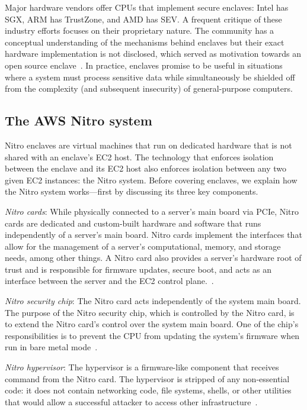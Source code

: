 Major hardware vendors offer CPUs that implement secure enclaves: Intel has SGX,
ARM has TrustZone, and AMD has SEV.  A frequent critique of these industry
efforts focuses on their proprietary nature. The community has a conceptual
understanding of the mechanisms behind enclaves but their exact hardware
implementation is not disclosed, which served as motivation towards an open
source enclave~\cite{Lee20a}.  In practice, enclaves promise to be useful in
situations where a system must process sensitive data while simultaneously be
shielded off from the complexity (and subsequent insecurity) of general-purpose
computers.

\subsection{The AWS Nitro system}%
\label{sec:nitro}

Nitro enclaves are virtual machines that run on dedicated hardware that is not
shared with an enclave's EC2 host.  The technology that enforces isolation
between the enclave and its EC2 host also enforces isolation between any two
given EC2 instances: the Nitro system.  Before covering enclaves, we explain how
the Nitro system works---first by discussing its three key components.

\emph{Nitro cards}: While physically connected to a server's main board via
PCIe, Nitro cards are dedicated and custom-built hardware and software that runs
independently of a server's main board.  Nitro cards implement the interfaces
that allow for the management of a server's computational, memory, and storage
needs, among other things.  A Nitro card also provides a server's hardware root
of trust and is responsible for firmware updates, secure boot, and acts as an
interface between the server and the EC2 control plane.~\cite[pp.
7--10]{Bean2022a}.

\emph{Nitro security chip}: The Nitro card acts independently of the system main
board.  The purpose of the Nitro security chip, which is controlled by the Nitro
card, is to extend the Nitro card's control over the system main board.  One of
the chip's responsibilities is to prevent the CPU from updating the system's
firmware when run in bare metal mode~\cite[pp.~10--11]{Bean2022a}.

\emph{Nitro hypervisor}:
The hypervisor is a firmware-like component that receives command from the Nitro
card.  The hypervisor is stripped of any non-essential code: it does not contain
networking code, file systems, shells, or other utilities that would allow a
successful attacker to access other infrastructure~\cite[pp.~11--12]{Bean2022a}.

